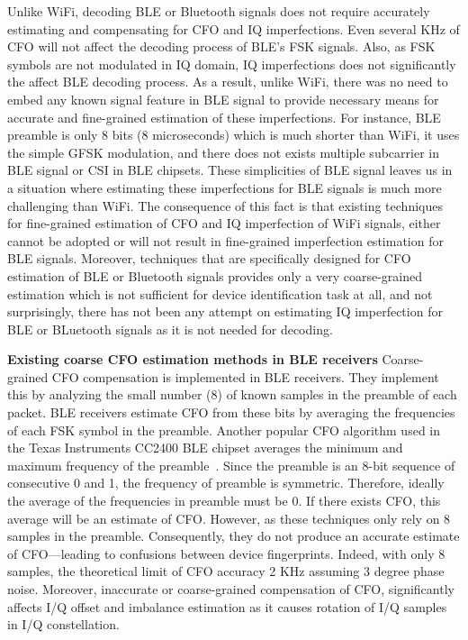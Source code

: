 Unlike WiFi, decoding BLE or Bluetooth signals does not require accurately
estimating and compensating for CFO and IQ imperfections.
%
Even several KHz of CFO will not affect the decoding process of BLE's FSK
signals. Also, as FSK symbols are not modulated in IQ domain, IQ imperfections
does not significantly the affect BLE decoding process.
%
As a result, unlike WiFi, there was no need to embed any known signal feature
in BLE signal to provide necessary means for accurate and fine-grained
estimation of these imperfections.
%
For instance, BLE preamble is only 8 bits (8 microseconds) which is much
shorter than WiFi, it uses the simple GFSK modulation, and there does not
exists multiple subcarrier in BLE signal or CSI in BLE chipsets. These
simplicities of BLE signal leaves us in a situation where estimating these
imperfections for BLE signals is much more challenging than WiFi.
The consequence of this fact is that existing techniques for fine-grained
estimation of CFO and IQ imperfection of WiFi signals, either cannot be
adopted or will not result in fine-grained imperfection estimation for BLE
signals.  Moreover, techniques that are specifically designed for CFO
estimation of BLE or Bluetooth signals provides only a very coarse-grained
estimation which is not sufficient for device identification task at all, and
not surprisingly, there has not been any attempt on estimating IQ imperfection
for BLE or BLuetooth signals as it is not needed for decoding.
\fi

\vspace{0.5em}
\noindent\textbf{Existing coarse CFO estimation methods in BLE receivers}
Coarse-grained CFO compensation is implemented in BLE receivers.  They
implement this by analyzing the small number (8) of known samples in the
preamble of each packet.
%
BLE receivers estimate CFO from these bits by averaging the frequencies of each
FSK symbol in the preamble. Another popular CFO algorithm used in the Texas
Instruments CC2400 BLE chipset averages the minimum and maximum frequency of
the preamble~\cite{cvtracksun}.
%
Since the preamble is an 8-bit sequence of consecutive 0 and 1, the frequency
of preamble is symmetric.  Therefore, ideally the average of the frequencies in
preamble must be 0. If there exists CFO, this average will be an estimate of
CFO.
%
However, as these techniques only rely on 8 samples in the preamble. Consequently, they do not produce an
accurate estimate of CFO---leading to confusions between device fingerprints.
%
Indeed, with only 8 samples, the theoretical limit of CFO accuracy 2 KHz assuming 3 degree phase noise. Moreover, inaccurate or coarse-grained compensation of CFO, significantly affects I/Q offset and imbalance estimation as it causes rotation of I/Q samples in I/Q constellation.



